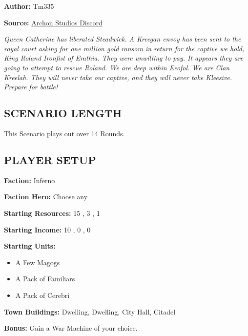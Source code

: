 
\begin{multicols}{2}

\textbf{Author:} Tm335

\textbf{Source:} \href{https://discord.com/channels/740870068178649108/1253923753981902939/1253923753981902939}{Archon Studios Discord}

\textit{Queen Catherine has liberated Steadwick.
A Kreegan envoy has been sent to the royal court asking for one million gold ransom in return for the captive we hold, King Roland Ironfist of Erathia.
They were unwilling to pay.
It appears they are going to attempt to rescue Roland.
We are deep within Eeofol.
We are Clan Kreelah.
They will never take our captive, and they will never take Kleesive.
Prepare for battle!}

\subsection*{\MakeUppercase{Scenario Length}}

This Scenario plays out over 14 Rounds.

\subsection*{\MakeUppercase{Player Setup}}

\textbf{Faction:} Inferno

\textbf{Faction Hero:} Choose any

\textbf{Starting Resources:} 15 , 3 , 1 

\textbf{Starting Income:} 10 , 0 , 0 

\textbf{Starting Units:}

\begin{itemize}
  \item A Few Magogs
  \item A Pack of Familiars
  \item A Pack of Cerebri
\end{itemize}

\textbf{Town Buildings:}  Dwelling,  Dwelling, City Hall, Citadel

\textbf{Bonus:} Gain a War Machine of your choice.


\end{multicols}
